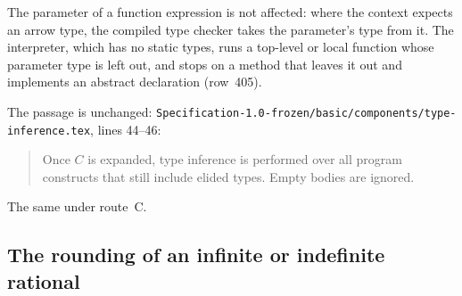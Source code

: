 \begin{description}
The parameter of a function expression is not affected: where the context
expects an arrow type, the compiled type checker takes the parameter's type
from it.
The interpreter, which has no static types, runs a top-level or local function
whose parameter type is left out, and stops on a method that leaves it out and
implements an abstract declaration (row~405).
\item[Original text] The passage is unchanged:
\nolinkurl{Specification-1.0-frozen/basic/components/type-inference.tex},
lines 44--46:
\begin{quote}
Once $C$ is expanded, type inference
is performed over all program constructs that still include elided types.
Empty bodies are ignored.
\end{quote}
\item[Route C] The same under route~C.
\end{description}

\subsection{The rounding of an infinite or indefinite rational}

